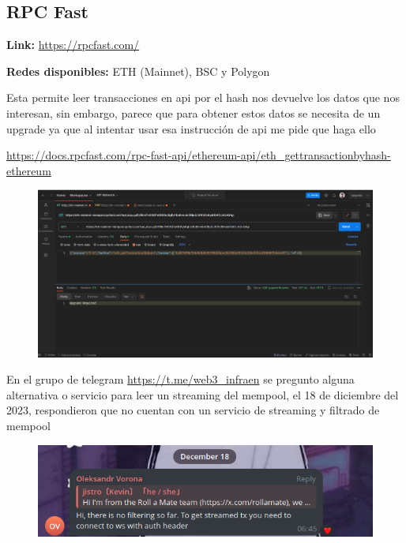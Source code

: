 \subsection{RPC Fast}

\textbf{Link:} \url{https://rpcfast.com/}

\textbf{Redes disponibles:} ETH (Mainnet), BSC y Polygon

\medskip

Esta permite leer transacciones en api por el hash nos devuelve los datos que nos interesan, sin embargo, parece que para obtener estos datos se necesita de un upgrade ya que al intentar usar esa instrucción de api me pide que haga ello

\url{https://docs.rpcfast.com/rpc-fast-api/ethereum-api/eth_gettransactionbyhash-ethereum}

\begin{figure}
    \centering
    \includegraphics[width=1\linewidth]{img//screenshots/Screenshot from 2023-12-17 00-07-19.png}
\end{figure}

En el grupo de telegram \url{https://t.me/web3_infraen} se pregunto alguna alternativa o servicio para leer un streaming del mempool, el 18 de diciembre del 2023, respondieron que no cuentan con un servicio de streaming y filtrado de mempool

\begin{figure}
    \centering
    \includegraphics[width=1\linewidth]{Screenshot from 2023-12-18 13-33-23.png}
    
    
\end{figure}

